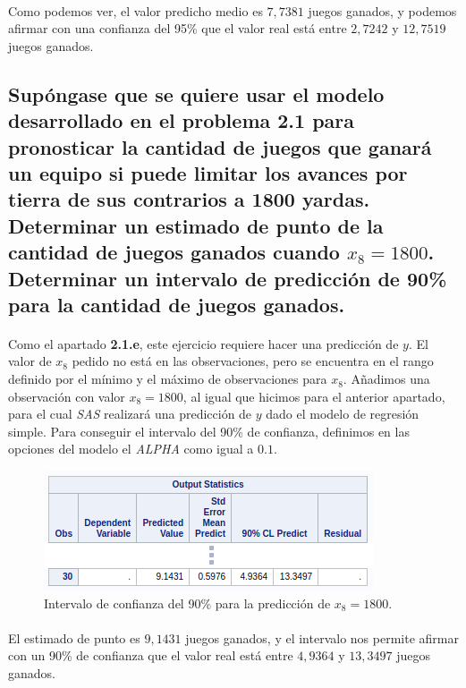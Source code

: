 \documentclass{article}
\begin{document}
  \paragraph{}
  Como podemos ver, el valor predicho medio es $7,7381$ juegos ganados, y podemos afirmar con una confianza del 95\% que el valor real está entre $2,7242$ y $12,7519$ juegos ganados.

  \subsection{Supóngase que se quiere usar el modelo desarrollado en el problema 2.1 para pronosticar la cantidad de juegos que ganará un equipo si puede limitar los avances por tierra de sus contrarios a 1800 yardas. Determinar un estimado de punto de la cantidad de juegos ganados cuando $x_8=1800$. Determinar un intervalo de predicción de 90\% para la cantidad de juegos ganados.}

  \paragraph{}
  Como el apartado \textbf{2.1.e}, este ejercicio requiere hacer una predicción de $y$. El valor de $x_8$ pedido no está en las observaciones, pero se encuentra en el rango definido por el mínimo y el máximo de observaciones para $x_8$. Añadimos una observación con valor $x_8=1800$, al igual que hicimos para el anterior apartado, para el cual \textit{SAS} realizará una predicción de $y$ dado el modelo de regresión simple. Para conseguir el intervalo del 90\% de confianza, definimos en las opciones del modelo el \textit{ALPHA} como igual a $0.1$.

  \begin{figure}[H]
    \centering
    \includegraphics[width=.5\linewidth]{img/montgomery/prediccion1800.png}
    \caption{Intervalo de confianza del 90\% para la predicción de $x_8=1800$.}
    \label{img:mont-prediccion1800}
  \end{figure}

  \paragraph{}
  El estimado de punto es $9,1431$ juegos ganados, y el intervalo nos permite afirmar con un 90\% de confianza que el valor real está entre $4,9364$ y $13,3497$ juegos ganados.
\end{document}
